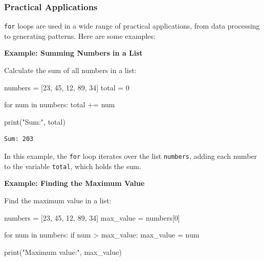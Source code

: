 \documentclass[
  letterpaper,
  DIV=11,
  numbers=noendperiod]{scrreprt}
\newenvironment{Shaded}{\begin{snugshade}}{\end{snugshade}}
\newcommand{\BuiltInTok}[1]{\textcolor[rgb]{0.00,0.23,0.31}{#1}}
\newcommand{\ControlFlowTok}[1]{\textcolor[rgb]{0.00,0.23,0.31}{#1}}
\newcommand{\DecValTok}[1]{\textcolor[rgb]{0.68,0.00,0.00}{#1}}
\newcommand{\KeywordTok}[1]{\textcolor[rgb]{0.00,0.23,0.31}{#1}}
\newcommand{\NormalTok}[1]{\textcolor[rgb]{0.00,0.23,0.31}{#1}}
\newcommand{\OperatorTok}[1]{\textcolor[rgb]{0.37,0.37,0.37}{#1}}
\newcommand{\StringTok}[1]{\textcolor[rgb]{0.13,0.47,0.30}{#1}}
\begin{document}
\hypertarget{practical-applications-1}{%
\subsubsection{Practical Applications}\label{practical-applications-1}}

\texttt{for} loops are used in a wide range of practical applications,
from data processing to generating patterns. Here are some examples:

\textbf{Example: Summing Numbers in a List}

Calculate the sum of all numbers in a list:

\begin{Shaded}
\begin{Highlighting}[]
\NormalTok{numbers }\OperatorTok{=}\NormalTok{ [}\DecValTok{23}\NormalTok{, }\DecValTok{45}\NormalTok{, }\DecValTok{12}\NormalTok{, }\DecValTok{89}\NormalTok{, }\DecValTok{34}\NormalTok{]}
\NormalTok{total }\OperatorTok{=} \DecValTok{0}

\ControlFlowTok{for}\NormalTok{ num }\KeywordTok{in}\NormalTok{ numbers:}
\NormalTok{    total }\OperatorTok{+=}\NormalTok{ num}

\BuiltInTok{print}\NormalTok{(}\StringTok{"Sum:"}\NormalTok{, total)}
\end{Highlighting}
\end{Shaded}

\begin{verbatim}
Sum: 203
\end{verbatim}

In this example, the \texttt{for} loop iterates over the list
\texttt{numbers}, adding each number to the variable \texttt{total},
which holds the sum.

\textbf{Example: Finding the Maximum Value}

Find the maximum value in a list:

\begin{Shaded}
\begin{Highlighting}[]
\NormalTok{numbers }\OperatorTok{=}\NormalTok{ [}\DecValTok{23}\NormalTok{, }\DecValTok{45}\NormalTok{, }\DecValTok{12}\NormalTok{, }\DecValTok{89}\NormalTok{, }\DecValTok{34}\NormalTok{]}
\NormalTok{max\_value }\OperatorTok{=}\NormalTok{ numbers[}\DecValTok{0}\NormalTok{]}

\ControlFlowTok{for}\NormalTok{ num }\KeywordTok{in}\NormalTok{ numbers:}
    \ControlFlowTok{if}\NormalTok{ num }\OperatorTok{\textgreater{}}\NormalTok{ max\_value:}
\NormalTok{        max\_value }\OperatorTok{=}\NormalTok{ num}

\BuiltInTok{print}\NormalTok{(}\StringTok{"Maximum value:"}\NormalTok{, max\_value)}
\end{Highlighting}
\end{Shaded}
\end{document}

